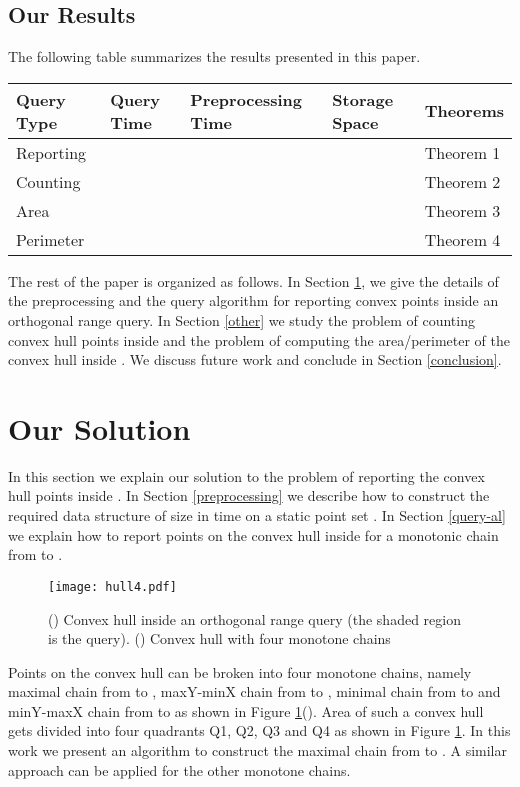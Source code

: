 \documentclass[runningheads,a4paper]{llncs}
\begin{document}
\subsection{Our Results} \label{our-results}
The following table summarizes the results presented in this paper.
\begin{center}
    \begin{tabular}{ | l | l | l | l | p{2cm} |}
    \hline
    \textbf{Query Type} & \textbf{Query Time} & \textbf{Preprocessing Time} &  \textbf{Storage Space} & \textbf{Theorems} \\ \hline
    Reporting &  &  &  & Theorem 1 \\ \hline
    Counting &  &  &  & Theorem 2 \\ \hline
    Area &  &  &  & Theorem 3 \\ \hline
    Perimeter &  &  &  & Theorem 4 \\ \hline
    \hline
    \end{tabular}
\end{center}
The rest of the paper is organized as follows. In Section \ref{Basic idea}, we
give the details of the preprocessing and the query algorithm for reporting
convex points inside an orthogonal range query. In Section \ref{other} we
study the problem of counting convex hull points inside  and the
problem of computing the area/perimeter of the convex hull inside . We discuss future work and conclude in Section \ref{conclusion}.
\section{Our Solution}\label{Basic idea}
In this section we explain our solution to the problem of reporting the convex hull points inside .
In Section \ref{preprocessing} we describe how to construct the required data structure of 
size  in time  on a static point set .
In Section \ref{query-al} we explain how to report points on the convex hull inside  for a monotonic chain from  to .
\begin{figure}
\vspace{-0.5cm}
\centering
\texttt{[image: hull4.pdf]}
\caption{() Convex hull inside an orthogonal range query (the shaded region is
  the query). () Convex hull with four monotone chains}
\label{fig1}
\vspace{-0.5cm}
\end{figure}
Points on the convex hull can be broken into four monotone chains, namely
maximal chain from  to , maxY-minX chain from 
to , minimal chain from  to  and
minY-maxX chain from  to  as shown in Figure \ref{fig1}().
Area of such a convex hull gets divided into four quadrants Q1, Q2, Q3 and Q4 as shown in Figure \ref{fig1}.
In this work we present an algorithm to construct the maximal chain from
 to .  A similar approach can be applied for the other
monotone chains.
\end{document}
